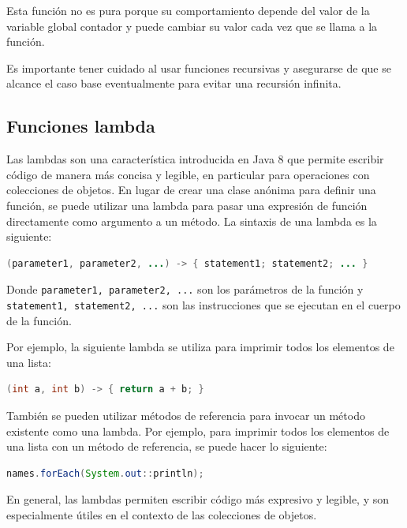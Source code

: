 \documentclass[executivepaper]{article}
\begin{document}
Esta función no es pura porque su comportamiento depende del valor de la variable global contador y puede cambiar su valor cada vez que se llama a la función.

Es importante tener cuidado al usar funciones recursivas y asegurarse de que se alcance el caso base eventualmente para evitar una recursión infinita.

\subsection{Funciones lambda}

Las lambdas son una característica introducida en Java 8 que permite escribir código de manera más concisa y legible, en particular para operaciones con colecciones de objetos. En lugar de crear una clase anónima para definir una función, se puede utilizar una lambda para pasar una expresión de función directamente como argumento a un método. La sintaxis de una lambda es la siguiente:

\begin{lstlisting}[language=Java]
(parameter1, parameter2, ...) -> { statement1; statement2; ... }
\end{lstlisting}

Donde \texttt{parameter1, parameter2, ...} son los parámetros de la función y \texttt{statement1, statement2, ...} son las instrucciones que se ejecutan en el cuerpo de la función. 

Por ejemplo, la siguiente lambda se utiliza para imprimir todos los elementos de una lista:

\begin{lstlisting}[language=Java]
(int a, int b) -> { return a + b; }
\end{lstlisting}

También se pueden utilizar métodos de referencia para invocar un método existente como una lambda. Por ejemplo, para imprimir todos los elementos de una lista con un método de referencia, se puede hacer lo siguiente:

\begin{lstlisting}[language=Java]
names.forEach(System.out::println);
\end{lstlisting}

En general, las lambdas permiten escribir código más expresivo y legible, y son especialmente útiles en el contexto de las colecciones de objetos.
\end{document}
